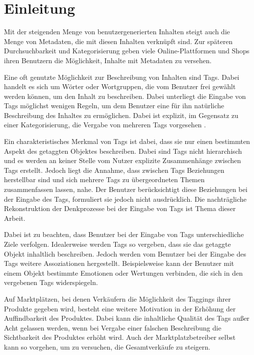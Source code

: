 \chapter{Einleitung}

Mit der steigenden Menge von benutzergenerierten Inhalten steigt auch die Menge von Metadaten, die mit diesen Inhalten verknüpft sind. Zur späteren Durchsuchbarkeit und Kategorisierung geben viele Online-Plattformen und Shops ihren Benutzern die Möglichkeit, Inhalte mit Metadaten zu versehen.

Eine oft genutzte Möglichkeit zur Beschreibung von Inhalten sind Tags. Dabei handelt es sich um Wörter oder Wortgruppen, die vom Benutzer frei gewählt werden können, um den Inhalt zu beschreiben. Dabei unterliegt die Eingabe von Tags möglichst wenigen Regeln, um dem Benutzer eine für ihn natürliche Beschreibung des Inhaltes zu ermöglichen. Dabei ist explizit, im Gegensatz zu einer Kategorisierung, die Vergabe von mehreren Tags vorgesehen \cite{sc2005}.

Ein charakteristisches Merkmal von Tags ist dabei, dass sie nur einen bestimmten Aspekt des getaggten Objektes beschreiben. Dabei sind Tags nicht hierarchisch und es werden an keiner Stelle vom Nutzer explizite Zusammenhänge zwischen Tags erstellt. Jedoch liegt die Annahme, dass zwischen Tags Beziehungen herstellbar sind und sich mehrere Tags zu übergeordneten Themen zusammenfassen lassen, nahe. Der Benutzer berücksichtigt diese Beziehungen bei der Eingabe des Tags, formuliert sie jedoch nicht ausdrücklich. Die nachträgliche Rekonstruktion der Denkprozesse bei der Eingabe von Tags ist Thema dieser Arbeit.

Dabei ist zu beachten, dass Benutzer bei der Eingabe von Tags unterschiedliche Ziele verfolgen. Idealerweise werden Tags so vergeben, dass sie das getaggte Objekt inhaltlich beschreiben. Jedoch werden vom Benutzer bei der Eingabe des Tags weitere Assoziationen hergestellt. Beispielsweise kann der Benutzer mit einem Objekt bestimmte Emotionen oder Wertungen verbinden, die sich in den vergebenen Tags widerspiegeln.

Auf Marktplätzen, bei denen Verkäufern die Möglichkeit des Taggings ihrer Produkte gegeben wird, besteht eine weitere Motivation in der Erhöhung der Auffindbarkeit des Produktes. Dabei kann die inhaltliche Qualität des Tags außer Acht gelassen werden, wenn bei Vergabe einer falschen Beschreibung die Sichtbarkeit des Produktes erhöht wird. Auch der Marktplatzbetreiber selbst kann so vorgehen, um zu versuchen, die Gesamtverkäufe zu steigern.

